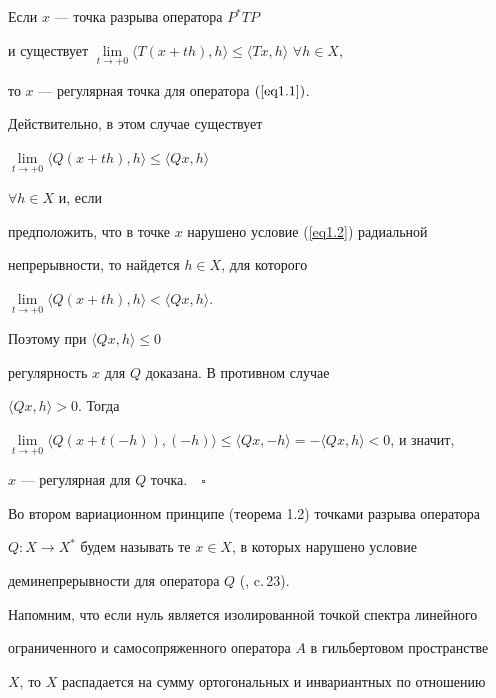 \begin{props} Если $x$ --- точка разрыва оператора $P^{*}TP$


и существует $\lim\limits_{t\to +0} \langle T(x+th),h \rangle \le


\langle Tx,h \rangle$ $\forall h\in X$,


то $x$ --- регулярная точка для оператора $(\ref{eq1.1})$.


\end{props}





Действительно, в этом случае существует


$\lim\limits_{t\to +0} \langle Q(x+th),h \rangle \le \langle Qx,h \rangle$


$\forall h\in X $ и, если


предположить, что в точке $x$ нарушено условие (\ref{eq1.2}) радиальной


непрерывности, то найдется $h \in X$, для которого


$\lim\limits_{t\to +0} \langle Q(x+th),h \rangle < \langle Qx,h \rangle$.


Поэтому при $\langle Qx,h \rangle \le 0$


регулярность $x$ для $Q$ доказана. В противном случае


$\langle Qx,h \rangle > 0$. Тогда


$\lim\limits_{t\to +0} \langle Q(x+t(-h)),(-h)


\rangle \le \langle Qx,-h \rangle 


= -\langle Qx,h \rangle < 0$, и значит,


$x$ --- регулярная для $Q$ точка$.\quad\square$


\medskip





Во втором вариационном принципе (теорема 1.2) точками разрыва оператора


$Q: X \to X^{*}$ будем называть те $x \in X$, в которых нарушено условие


деминепрерывности для оператора $Q$ (\cite{n13}, c.\,23).


Напомним, что если нуль является изолированной точкой спектра линейного


ограниченного и самосопряженного оператора $A$ в гильбертовом пространстве


$X$, то $X$ распадается на сумму ортогональных и инвариантных по отношению


